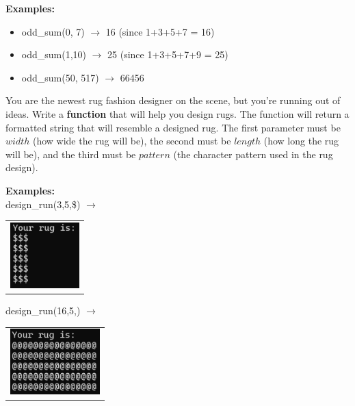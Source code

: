 		\textbf{Examples:}		
		\begin{itemize}
			\item  odd\_sum(0, 7) $\rightarrow$ 16 (since 1+3+5+7 = 16)
			\item odd\_sum(1,10) $\rightarrow$ 25 (since 1+3+5+7+9 = 25)
			\item  odd\_sum(50, 517) $\rightarrow$ 66456 
		\end{itemize}



	\item 
		You are the newest rug fashion designer on the scene, but you're running out of ideas. 
		Write a \textbf{function} that will help you design rugs.  The function will return a 
		formatted string that will resemble a designed rug. The first parameter must be $width$ 
		(how wide the rug will be), the second must be $length$ (how long the rug will be), 
		and the third must be $pattern$ (the character pattern used in the rug design).

		\textbf{Examples:} \\
			design\_run(3,5,\$) $\rightarrow$	\begin{tabular}{l}
			\includegraphics[height=1in]{./imgs/rug1_alt.PNG} \hspace{0.5in} \end{tabular}
			design\_run(16,5,\@) $\rightarrow$ \begin{tabular}{l}
			\includegraphics[height=1in]{./imgs/rug2_alt.PNG} \end{tabular}



